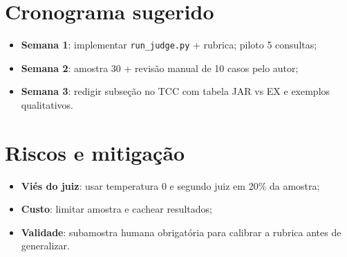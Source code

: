 \section{Cronograma sugerido}

\begin{itemize}
    \item \textbf{Semana 1}: implementar \texttt{run\_judge.py} + rubrica; piloto 5 consultas;
    \item \textbf{Semana 2}: amostra 30 + revisão manual de 10 casos pelo autor;
    \item \textbf{Semana 3}: redigir subseção no TCC com tabela JAR vs EX e exemplos qualitativos.
\end{itemize}

\section{Riscos e mitigação}

\begin{itemize}
    \item \textbf{Viés do juiz}: usar temperatura 0 e segundo juiz em 20\% da amostra;
    \item \textbf{Custo}: limitar amostra e cachear resultados;
    \item \textbf{Validade}: subamostra humana obrigatória para calibrar a rubrica antes de generalizar.
\end{itemize}
